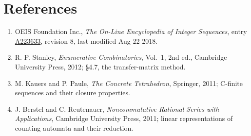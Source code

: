 \documentclass[11pt]{article}
\theoremstyle{definition}
\begin{document}
\section{References}

\begin{enumerate}

\item OEIS Foundation Inc., \emph{The On-Line Encyclopedia of Integer Sequences}, entry \href{https://oeis.org/A223633}{A223633}, revision 8, last modified Aug 22 2018.

\item R. P. Stanley, \emph{Enumerative Combinatorics}, Vol.~1, 2nd ed., Cambridge University Press, 2012; \S4.7, the transfer-matrix method.

\item M. Kauers and P. Paule, \emph{The Concrete Tetrahedron}, Springer, 2011; C-finite sequences and their closure properties.

\item J. Berstel and C. Reutenauer, \emph{Noncommutative Rational Series with Applications}, Cambridge University Press, 2011; linear representations of counting automata and their reduction.

\end{enumerate}
\end{document}

